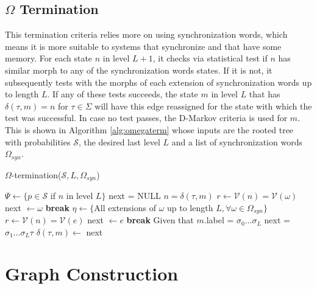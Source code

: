 {\subsection{$\Omega$ Termination}

This termination criteria relies more on using synchronization words, which means it is more suitable to systems that synchronize and that have some memory. For each state $n$ in level $L+1$, it checks via statistical test if $n$ has similar morph to any of the synchronization words states. If it is not, it subsequently tests with the morphs of each extension of synchronization words up to length $L$. If any of these tests succeeds, the state $m$ in level $L$ that has $\delta(\tau,m) = n$ for $\tau \in \Sigma$ will have this edge reassigned for the state with which the test was successful. In case no test passes, the D-Markov criteria is used for $m$. This is shown in Algorithm \ref{alg:omegaterm} whose inputs are the rooted tree with probabilities $\mathcal{S}$, the desired last level $L$ and a list of synchronization words $\Omega_{syn}$.  

  \begin{algorithm}
  \caption{$\Omega$-termination($\mathcal{S}, L, \Omega_{syn}$)\label{alg:omegaterm}}
    \begin{algorithmic}[1]
      	\State $\Psi \gets \{p \in \mathcal{S}$ if $n$ in level $L\}$
      		\State next = NULL
      		\For{$\tau \in \Sigma$}
      			\State $n = \delta(\tau,m)$
      				\State $r \gets \mathcal{V}(n) = \mathcal{V}(\omega)$
      					\State next $\gets \omega$
      					\State \textbf{break}
      				\EndIf
      			\EndFor
      				\State $\eta \gets \{$All extensions of $\omega$ up to length $L, \forall \omega \in \Omega_{syn}\}$
      				\State $r \gets \mathcal{V}(n) = \mathcal{V}(e)$
      						\State next $\gets e$
      						\State \textbf{break}
      					\EndIf
      				\EndFor
      			\EndIf
      				\State Given that $m$.label = $\sigma_0\ldots\sigma_L$
      				\State next = $\sigma_1\ldots\sigma_L\tau$
      			\EndIf
      			\State $\delta(\tau,m) \gets$ next
      		\EndFor
      	\EndFor
      \EndProcedure
    \end{algorithmic}
  \end{algorithm}

\section{Graph Construction}

}
